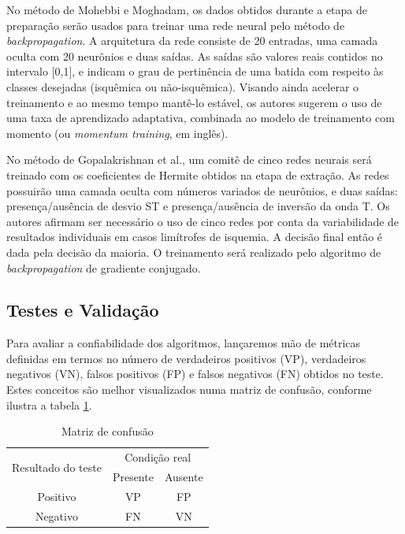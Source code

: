 No método de Mohebbi e Moghadam, os dados obtidos durante a etapa de preparação serão usados para treinar uma rede neural pelo método de \emph{backpropagation}. A arquitetura da rede consiste de 20 entradas, uma camada oculta com 20 neurônios e duas saídas. As saídas são valores reais contidos no intervalo [0,1], e indicam o grau de pertinência de uma batida com respeito às classes desejadas (isquêmica ou não-isquêmica). Visando ainda acelerar o treinamento e ao mesmo tempo mantê-lo estável, os autores sugerem o uso de uma taxa de aprendizado adaptativa, combinada ao modelo de treinamento com momento (ou \emph{momentum training}, em inglês).

No método de Gopalakrishnan et al., um comitê de cinco redes neurais será treinado com os coeficientes de Hermite obtidos na etapa de extração. As redes possuirão uma camada oculta com números variados de neurônios, e duas saídas: presença/ausência de desvio ST e presença/ausência de inversão da onda T. Os autores afirmam ser necessário o uso de cinco redes por conta da variabilidade de resultados individuais em casos limítrofes de isquemia. A decisão final então é dada pela decisão da maioria. O treinamento será realizado pelo algoritmo de \emph{backpropagation} de gradiente conjugado.

\subsection{Testes e Validação}
Para avaliar a confiabilidade dos algoritmos, lançaremos mão de métricas definidas em termos no número de verdadeiros positivos (VP), verdadeiros negativos (VN), falsos positivos (FP) e falsos negativos (FN) obtidos no teste. Estes conceitos são melhor visualizados numa matriz de confusão, conforme ilustra a tabela \ref{tab:confusion_matrix}.

\begin{table}[ht] 
    \caption{Matriz de confusão}
    \centering
    \begin{tabular}{ccc}
        \toprule
        \multirow{2}{2cm}{Resultado do teste} &
        \multicolumn{2}{c}{Condição real} \\
        \cmidrule{2-3}
        & Presente & Ausente \\ 
        \midrule
        Positivo & VP & FP \\
        \midrule
        Negativo & FN & VN \\
        \bottomrule
    \end{tabular} 
    \label{tab:confusion_matrix}
\end{table} 

